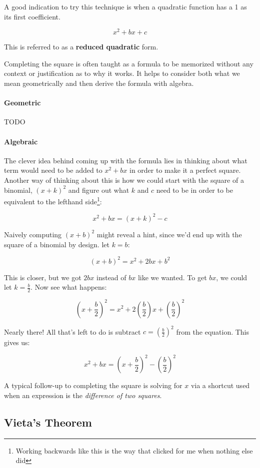 \documentclass{standalone}
\begin{document}
A good indication to try this technique is when a quadratic function has a 1 as
its first coefficient.

\[
  x^2 + bx + c
\]

This is referred to as a \textbf{reduced quadratic} form.

Completing the square is often taught as a formula to be memorized without any
context or justification as to why it works. It helps to consider both what we
mean geometrically and then derive the formula with algebra.

\paragraph{Geometric}

TODO

\paragraph{Algebraic}

The clever idea behind coming up with the formula lies in thinking about what
term would need to be added to $x^2 + bx$ in order to make it a perfect square.
Another way of thinking about this is how we could start with the square of a
binomial, $(x + k)^2$ and figure out what $k$ and $c$ need to be in order to be
equivalent to the lefthand side\footnote{Working backwards like this is the way
that clicked for me when nothing else did}:

\[
  x^2 + bx = (x + k)^2 - c
\]

Naively computing $(x + b)^2$ might reveal a hint, since we'd end up with the
square of a binomial by design. let $k = b$:

\[
  (x + b)^2 = x^2 + 2bx + b^2
\]

This is closer, but we got $2bx$ instead of $bx$ like we wanted. To get $bx$,
we could let $k = \frac b 2$. Now see what happens:

\[
  (x + \frac b 2)^2 = x^2 + 2 (\frac b 2) x + (\frac b 2)^2
\]

Nearly there! All that's left to do is subtract $c = (\frac b 2)^2$ from the
equation. This gives us:

\[
  \boxed{x^2 + bx = (x + \frac b 2)^2 - (\frac b 2)^2}
\]

A typical follow-up to completing the square is solving for $x$ via a shortcut
used when an expression is the \emph{difference of two squares}.

\subsection{Vieta's Theorem}
\end{document}
